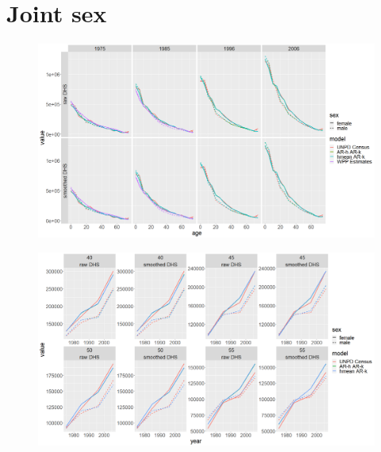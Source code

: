 \documentclass[12pt,a4paper]{article}
\begin{document}
\section*{\centering Joint sex}
\begin{figure}[H]
\includegraphics[width = \linewidth]{Burkina Faso/7/joint period pop.png}
\end{figure}
\begin{figure}[H]
\includegraphics[width = \linewidth]{Burkina Faso/7/joint age pop.png}
\end{figure}
\end{document}
